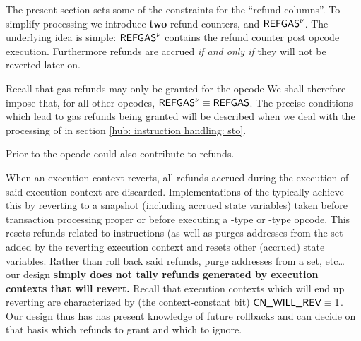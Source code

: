 The present section sets some of the constraints for the ``refund columns''.
To simplify processing we introduce \textbf{two} refund counters,  and $\textsf{REFGAS}^{\nu}$.
The underlying idea is simple: $\textsf{REFGAS}^{\nu}$ contains the refund counter post opcode execution.
Furthermore refunds are accrued \emph{if and only if} they will not be reverted later on.

Recall that gas refunds may only be granted for the
 opcode
We shall therefore impose that, for all other opcodes, $\textsf{REFGAS} ^{\nu} \equiv \textsf{REFGAS}$.
The precise conditions which lead to gas refunds being granted will be described when we deal with the processing of  in section
\ref{hub: instruction handling: sto}.

\saNote{} Prior to \cite{EIP3529} the  opcode could also contribute to refunds.

When an execution context reverts, all refunds accrued during the execution of said execution context are discarded.
Implementations of the \evm{} typically achieve this by reverting to a snapshot (including accrued state variables) taken before transaction processing proper or before executing a -type or -type opcode.
This resets refunds related to  instructions (as well as purges addresses from the  set added by the reverting execution context and resets other (accrued) state variables.
Rather than roll back said refunds, purge addresses from a  set, etc\dots{} our \zkEvm{} design \textbf{simply does not tally refunds generated by execution contexts that will revert.}
Recall that execution contexts which will end up reverting are characterized by (the context-constant bit) $\textsf{CN}\textsf{\_WILL\_REV} \equiv 1$.
Our \zkEvm{} design thus has has present knowledge of future rollbacks and can decide on that basis which refunds to grant and which to ignore.
